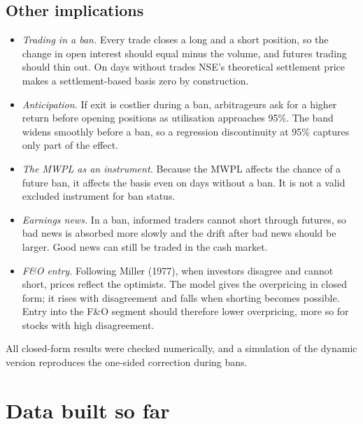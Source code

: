\documentclass[11pt,a4paper]{article}
\begin{document}
\subsection{Other implications}
\begin{itemize}
\item \emph{Trading in a ban.} Every trade closes a long and a short position, so the change in open interest should equal
minus the volume, and futures trading should thin out. On days without trades NSE's theoretical settlement price makes a
settlement-based basis zero by construction.
\item \emph{Anticipation.} If exit is costlier during a ban, arbitrageurs ask for a higher return before opening positions as
utilisation approaches 95\%. The band widens smoothly before a ban, so a regression discontinuity at 95\% captures only part of
the effect.
\item \emph{The MWPL as an instrument.} Because the MWPL affects the chance of a future ban, it affects the basis even on days
without a ban. It is not a valid excluded instrument for ban status.
\item \emph{Earnings news.} In a ban, informed traders cannot short through futures, so bad news is absorbed more slowly and
the drift after bad news should be larger. Good news can still be traded in the cash market.
\item \emph{F\&O entry.} Following Miller (1977), when investors disagree and cannot short, prices reflect the optimists. The
model gives the overpricing in closed form; it rises with disagreement and falls when shorting becomes possible. Entry into
the F\&O segment should therefore lower overpricing, more so for stocks with high disagreement.
\end{itemize}
All closed-form results were checked numerically, and a simulation of the dynamic version reproduces the one-sided correction
during bans.

\section{Data built so far}\label{sec:data}
\end{document}
